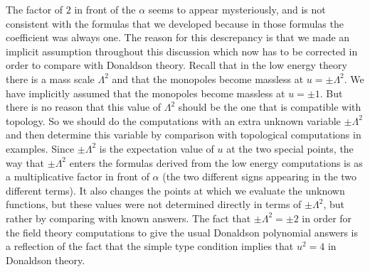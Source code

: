\documentclass[10pt]{article}
\begin{document}
The factor of $2$ in front of the $\alpha$ seems to appear
mysteriously, and is not consistent with the formulas that we
developed because in those formulas the coefficient was always one.
The reason for this descrepancy is that we made an implicit assumption
throughout this 
discussion which now has to be corrected in order to compare with
Donaldson theory. Recall that
in the low energy theory there is a mass scale $\Lambda^2$ and that
the monopoles become massless at $u=\pm \Lambda^2$. We have
implicitly assumed that the monopoles become massless at $u=\pm 1$.
But there is no reason that 
this value of $\Lambda^2$ should be the one that is compatible with
topology. So we should do the computations with an extra unknown
variable $\pm\Lambda^2$ and then determine this variable by comparison
with topological computations in 
examples. Since $\pm\Lambda^2$ is the expectation value of $u$ at the
two special points, the way that $\pm\Lambda^2$ enters the formulas
derived from the low energy computations is as
a multiplicative factor in front of $\alpha$ (the two different signs
appearing in the two different terms). It also changes the
points at which we evaluate the unknown functions, but these values
were not determined directly in terms of $\pm\Lambda^2$, but rather by
comparing with known answers. The fact that $\pm\Lambda^2=\pm 2$ in
order for the field theory computations to give the usual Donaldson
polynomial answers is a reflection of the fact that the simple type 
condition implies that $u^2=4$ in Donaldson theory.
\end{document}
